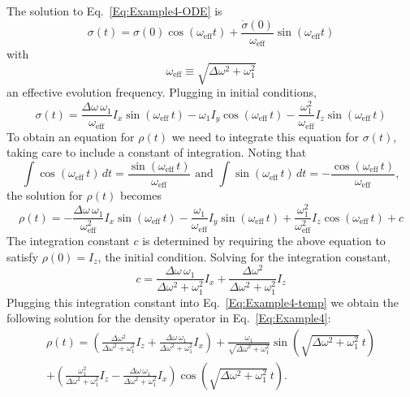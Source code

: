 The solution to Eq.~\ref{Eq:Example4-ODE} is
\begin{equation}
\sigma(t) 
	= \sigma(0) \cos{(\omega_{\text{eff}} t)}
	+ \frac{\dot{\sigma}(0)}{\omega_{\text{eff}}}
		\sin{(\omega_{\text{eff}} t)}
\end{equation}
with
\begin{equation}
\omega_{\text{eff}} \equiv \sqrt{\Delta\omega^2 + \omega_1^2}
\end{equation}
an effective evolution frequency.  Plugging in initial conditions,
\begin{equation}
\sigma(t) 
	= \frac{\Delta \omega \, \omega_1}{\omega_{\text{eff}}}
		I_x \sin{(\omega_{\text{eff}} \, t)}
	- \omega_1 I_y \cos{(\omega_{\text{eff}} \, t)}
	- \frac{\omega_1^2}{\omega_{\text{eff}}}
		I_z \sin{(\omega_{\text{eff}} \, t)}
\end{equation}
To obtain an equation for $\rho(t)$ we need to integrate this equation for $\sigma(t)$, taking care to include a constant of integration.  Noting that
\[
\int \cos{(\omega_{\text{eff}} \, t)} \, dt 
	= \frac{\sin{(\omega_{\text{eff}} \, t)}}
	       {\omega_{\text{eff}}}
\text{ and }
\int \sin{(\omega_{\text{eff}} \, t)} \, dt
	= - \frac{\cos{(\omega_{\text{eff}} \, t)}}
	       {\omega_{\text{eff}}},	       
\]
the solution for $\rho(t)$ becomes
\begin{equation}
\rho(t) 
	= - \frac{\Delta \omega \, \omega_1}{\omega_{\text{eff}}^2}
		I_x \sin{(\omega_{\text{eff}} \, t)}
	- \frac{\omega_1}{\omega_{\text{eff}}} 
		I_y \sin{(\omega_{\text{eff}} \, t)}
	+ \frac{\omega_1^2}{\omega_{\text{eff}}^2}
		I_z \cos{(\omega_{\text{eff}} \, t)}
	+ c
	\label{Eq:Example4-temp}
\end{equation}
The integration constant $c$ is determined by requiring the above equation to satisfy $\rho(0) = I_z$, the initial condition.  Solving for the integration constant,
\begin{equation}
c = \frac{\Delta\omega \, \omega_1}
         {\Delta\omega^2 + \omega_1^2} I_x
	+ \frac{\Delta\omega^2}
	       {\Delta\omega^2 + \omega_1^2} I_z
\end{equation}
Plugging this integration constant into Eq.~\ref{Eq:Example4-temp} we obtain the following solution for the density operator in Eq.~\ref{Eq:Example4}:
\begin{multline}
\rho(t) = \left( 
		\frac{\Delta\omega^2}
		     {\Delta\omega^2 + \omega_1^2} I_z
		+ \frac{\Delta\omega \, \omega_1}
		       {\Delta\omega^2 + \omega_1^2} I_x
	\right)
	+ 
	\frac{\omega_1}{\sqrt{\Delta\omega^2 + \omega_1^2}}
	\sin{(\sqrt{\Delta\omega^2 + \omega_1^2} \: t)}  
	\\ 
	+ 
	\left( 
		\frac{\omega_1^2}
		     {\Delta\omega^2 + \omega_1^2} I_z
		- \frac{\Delta\omega \, \omega_1}
		       {\Delta\omega^2 + \omega_1^2} I_x
	\right) 
	\cos{(\sqrt{\Delta\omega^2 + \omega_1^2} \: t)}.
	\label{Eq:example4-soln}	
\end{multline}

